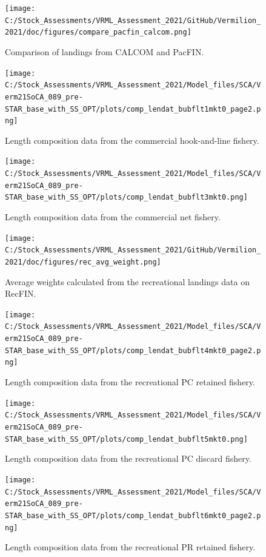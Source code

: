 \documentclass[11pt,
  english,
  a4paper,
]{article}
\begin{document}
\begin{figure}
\centering
\texttt{[image: C:/Stock\_Assessments/VRML\_Assessment\_2021/GitHub/Vermilion\_2021/doc/figures/compare\_pacfin\_calcom.png]}
\caption{Comparison of landings from CALCOM and PacFIN.\label{fig:calcom-pacfin}}
\end{figure}

\FloatBarrier

\FloatBarrier

\begin{figure}
\centering
\texttt{[image: C:/Stock\_Assessments/VRML\_Assessment\_2021/Model\_files/SCA/Verm21SoCA\_089\_pre-STAR\_base\_with\_SS\_OPT/plots/comp\_lendat\_bubflt1mkt0\_page2.png]}
\caption{Length composition data from the commercial hook-and-line fishery.\label{fig:len-data-COM-HKL}}
\end{figure}

\begin{figure}
\centering
\texttt{[image: C:/Stock\_Assessments/VRML\_Assessment\_2021/Model\_files/SCA/Verm21SoCA\_089\_pre-STAR\_base\_with\_SS\_OPT/plots/comp\_lendat\_bubflt3mkt0.png]}
\caption{Length composition data from the commercial net fishery.\label{fig:len-data-COM-NET}}
\end{figure}

\begin{figure}
\centering
\texttt{[image: C:/Stock\_Assessments/VRML\_Assessment\_2021/GitHub/Vermilion\_2021/doc/figures/rec\_avg\_weight.png]}
\caption{Average weights calculated from the recreational landings data on RecFIN.\label{fig:rec-avg-weights}}
\end{figure}

\begin{figure}
\centering
\texttt{[image: C:/Stock\_Assessments/VRML\_Assessment\_2021/Model\_files/SCA/Verm21SoCA\_089\_pre-STAR\_base\_with\_SS\_OPT/plots/comp\_lendat\_bubflt4mkt0\_page2.png]}
\caption{Length composition data from the recreational PC retained fishery.\label{fig:len-data-REC-PC}}
\end{figure}

\begin{figure}
\centering
\texttt{[image: C:/Stock\_Assessments/VRML\_Assessment\_2021/Model\_files/SCA/Verm21SoCA\_089\_pre-STAR\_base\_with\_SS\_OPT/plots/comp\_lendat\_bubflt5mkt0.png]}
\caption{Length composition data from the recreational PC discard fishery.\label{fig:len-data-REC-PC-DIS}}
\end{figure}

\begin{figure}
\centering
\texttt{[image: C:/Stock\_Assessments/VRML\_Assessment\_2021/Model\_files/SCA/Verm21SoCA\_089\_pre-STAR\_base\_with\_SS\_OPT/plots/comp\_lendat\_bubflt6mkt0\_page2.png]}
\caption{Length composition data from the recreational PR retained fishery.\label{fig:len-data-REC-PR}}
\end{figure}
\end{document}
